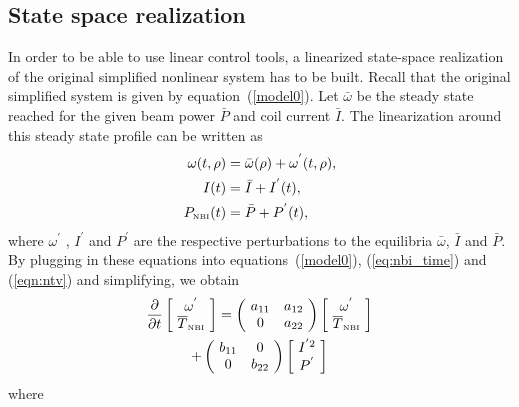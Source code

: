 \documentclass[12pt]{iopart}
\begin{document}
\subsection{State space realization}
\label{SS}
In order to be able to use linear control tools, a linearized state-space realization of the original simplified nonlinear system has to be built.
Recall that the original simplified system is given by equation~(\ref{model0}).
Let $\bar{\omega}$ be the steady state reached for the given beam power $ \bar{P}$ and coil current $\bar{I}$. The linearization around this steady state profile can be written as
\begin{align}
\omega (t, \rho) &= \bar{\omega} (\rho) + \omega^{'}(t, \rho), \\
I (t) &= \bar{I} + I^{'}(t),\\
P_\textrm{\tiny NBI} (t) &= \bar{P} + P^{'}(t),
\end{align}
where $ \omega^{'}$ , $ I^{'}$ and $P^{'}$ are the respective perturbations to the equilibria $\bar{\omega}$, $\bar{I}$ and $\bar{P}$.
By plugging in these equations into equations~(\ref{model0}), (\ref{eq:nbi_time}) and (\ref{eqn:ntv}) and simplifying, we obtain
\begin{multline}
	\frac{\partial}{\partial t}   \left[\! \begin{array}{c}  \omega^{'} \\ \overline{T}_\textrm{\tiny{NBI}} \end{array}\!\right]
		={ \left(\! \begin{array}{cc} a_{11}  & a_{12} \\ 0 & a_{22} \end{array} \! \right)} \left[\! \begin{array}{c} \omega^{'} \\ \overline{T}_\textrm{\tiny{NBI}}    \end{array}  \!\right] \\
		+ \left(\! \begin{array}{cc} b_{11}  & 0 \\ 0 & b_{22}    \end{array}  \!\right) \left[\! \begin{array}{c}  I^{'2}  \\ P^{'}\end{array}\!\right]
	\label{SSR}
\end{multline}
 where
\end{document}
